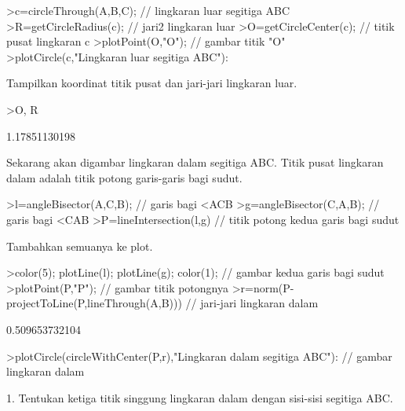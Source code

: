 \documentclass[a4paper,10pt]{article}
\begin{document}
\begin{eulernotebook}
\begin{eulercomment}
\begin{eulercomment}
\begin{eulerprompt}
>c=circleThrough(A,B,C); // lingkaran luar segitiga ABC
>R=getCircleRadius(c); // jari2 lingkaran luar 
>O=getCircleCenter(c); // titik pusat lingkaran c 
>plotPoint(O,"O"); // gambar titik "O"
>plotCircle(c,"Lingkaran luar segitiga ABC"):
\end{eulerprompt}
\begin{eulercomment}
Tampilkan koordinat titik pusat dan jari-jari lingkaran luar.
\end{eulercomment}
\begin{eulerprompt}
>O, R
\end{eulerprompt}
\begin{euleroutput}
  [1.16667,  1.16667]
  1.17851130198
\end{euleroutput}
\begin{eulercomment}
Sekarang akan digambar lingkaran dalam segitiga ABC. Titik pusat lingkaran dalam adalah
titik potong garis-garis bagi sudut.
\end{eulercomment}
\begin{eulerprompt}
>l=angleBisector(A,C,B); // garis bagi <ACB
>g=angleBisector(C,A,B); // garis bagi <CAB
>P=lineIntersection(l,g) // titik potong kedua garis bagi sudut
\end{eulerprompt}
\begin{euleroutput}
  [0.86038,  0.86038]
\end{euleroutput}
\begin{eulercomment}
Tambahkan semuanya ke plot.
\end{eulercomment}
\begin{eulerprompt}
>color(5); plotLine(l); plotLine(g); color(1); // gambar kedua garis bagi sudut
>plotPoint(P,"P"); // gambar titik potongnya
>r=norm(P-projectToLine(P,lineThrough(A,B))) // jari-jari lingkaran dalam
\end{eulerprompt}
\begin{euleroutput}
  0.509653732104
\end{euleroutput}
\begin{eulerprompt}
>plotCircle(circleWithCenter(P,r),"Lingkaran dalam segitiga ABC"): // gambar lingkaran dalam
\end{eulerprompt}
\begin{eulercomment}
1. Tentukan ketiga titik singgung lingkaran dalam dengan sisi-sisi
segitiga ABC.
\end{eulercomment}

\end{eulercomment}
\end{eulercomment}
\end{eulernotebook}
\end{document}
